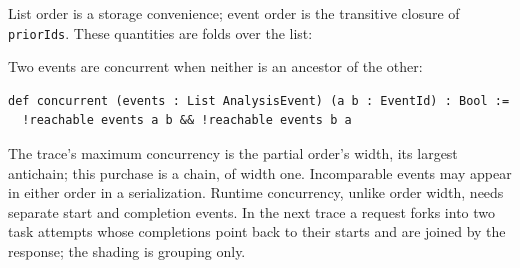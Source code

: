 List order is a storage convenience; event order is the transitive closure of
\texttt{priorIds}. These quantities are folds over the list:


Two events are concurrent when neither is an ancestor of the other:

\begin{lstlisting}
def concurrent (events : List AnalysisEvent) (a b : EventId) : Bool :=
  !reachable events a b && !reachable events b a
\end{lstlisting}

The trace's maximum concurrency is the partial order's width, its largest
antichain; this purchase is a chain, of width one. Incomparable events may appear
in either order in a serialization. Runtime concurrency, unlike order width, needs
separate start and completion events. In the next trace a request forks into two
task attempts whose completions point back to their starts and are joined by the
response; the shading is grouping only.


